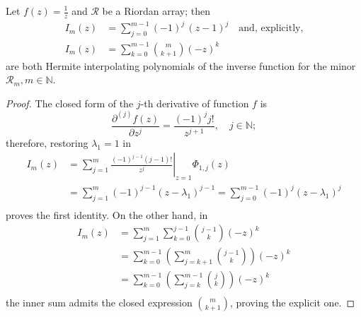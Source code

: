 

\begin{theorem}
\label{thm:inverse-Hermite-interpolating-poly-implicit}
Let $f(z)=\frac{1}{z}$ and $\mathcal{R}$ be a Riordan array; then 
\begin{equation}
  \label{eq:inverse-Hermite-interpolating-poly}
  \begin{split}
  I_{m}(z) &= \sum_{j=0}^{m-1}{(-1)^{j}\,\left(z-1\right)^{j}} \quad\text{and, explicitly,}\\
  I_{m}(z) &= \sum_{k=0}^{m-1}{{ {m}\choose{k+1}}(-z)^{k}}
  \end{split}
\end{equation}
are both Hermite interpolating polynomials of the inverse function for the minor
$\mathcal{R}_{m}, m\in\mathbb{N}$.
\end{theorem}

\begin{proof}
The closed form of the $j$-th derivative of function $f$ is 
\begin{displaymath}
\frac{\partial^{(j)}{f}(z)}{\partial{z}^{j}} = \frac{(-1)^{j}j!}{z^{j+1}},\quad j\in\mathbb{N};
\end{displaymath}
therefore, restoring $\lambda_{1}=1$ in
\begin{displaymath}
\begin{split}
  I_{m}(z) &= \sum_{j=1}^{m}{ \left. \frac{(-1)^{j-1}(j-1)!}{z^{j}} \right|_{z=1}\Phi_{1,j}(z)} \\
       &= \sum_{j=1}^{m}{(-1)^{j-1}\left(z-\lambda_{1}\right)^{j-1}}
       = \sum_{j=0}^{m-1}{(-1)^{j}\left(z-\lambda_{1}\right)^{j}} \\
\end{split}
\end{displaymath}
proves the first identity.  On the other hand, in
\begin{displaymath}
\begin{split}
  I_{m}(z)  &= \sum_{j=1}^{m}{\sum_{k=0}^{j-1}{{{j-1}\choose{k}}(-z)^{k}}} \\
            &= \sum_{k=0}^{m-1}{\left(\sum_{j=k+1}^{m}{{{j-1}\choose{k}}}\right)(-z)^{k}} \\
            &= \sum_{k=0}^{m-1}{\left(\sum_{j=k}^{m-1}{{{j}\choose{k}}}\right)(-z)^{k}} \\
\end{split}
\end{displaymath}
the inner sum admits the closed expression ${{m}\choose{k+1}}$, proving the explicit one.
\qedhere
\end{proof}





